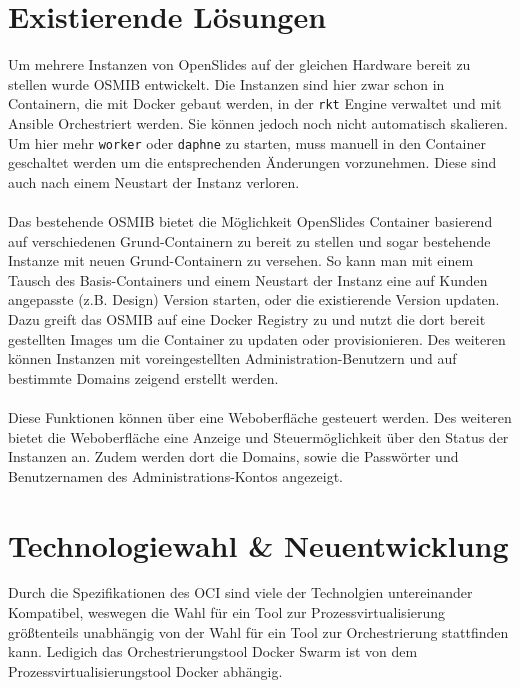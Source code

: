 \documentclass[a4paper]{article}
\begin{document}
\section{Existierende Lösungen}
Um mehrere Instanzen von OpenSlides auf der gleichen Hardware bereit zu stellen 
wurde \acf{OSMIB}\cite{osmib} entwickelt. Die Instanzen sind hier zwar schon in 
Containern, die mit Docker gebaut werden, in der \texttt{rkt} Engine verwaltet 
und mit Ansible Orchestriert werden. Sie können jedoch noch nicht automatisch 
skalieren. Um hier mehr \texttt{worker} oder \texttt{daphne} zu starten, muss 
manuell in den Container geschaltet werden um die entsprechenden Änderungen 
vorzunehmen. Diese sind auch nach einem Neustart der Instanz verloren.\\
\\
Das bestehende \ac{OSMIB} bietet die Möglichkeit OpenSlides Container basierend 
auf verschiedenen Grund-Containern zu bereit zu stellen und sogar bestehende 
Instanze mit neuen Grund-Containern zu versehen. So kann man mit einem Tausch 
des Basis-Containers und einem Neustart der Instanz eine auf Kunden angepasste 
(z.B. Design) Version starten, oder die existierende Version updaten. Dazu 
greift das \ac{OSMIB} auf eine Docker Registry\cite{osdr} zu und nutzt die dort 
bereit gestellten Images um die Container zu updaten oder provisionieren. Des 
weiteren können Instanzen mit voreingestellten Administration-Benutzern und auf 
bestimmte Domains zeigend erstellt werden.\\
\\
Diese Funktionen können über eine Weboberfläche gesteuert werden. Des weiteren 
bietet die Weboberfläche eine Anzeige und Steuermöglichkeit über den Status der 
Instanzen an. Zudem werden dort die Domains, sowie die Passwörter und 
Benutzernamen des Administrations-Kontos angezeigt.
\newpage
\section{Technologiewahl \& Neuentwicklung} \label{sec:tun}
Durch die Spezifikationen des \ac{OCI} sind viele der Technolgien untereinander 
Kompatibel, weswegen die Wahl für ein Tool zur Prozessvirtualisierung 
größtenteils unabhängig von der Wahl für ein Tool zur Orchestrierung 
stattfinden kann. Ledigich das Orchestrierungstool Docker Swarm ist von dem 
Prozessvirtualisierungstool Docker abhängig.
\end{document}
